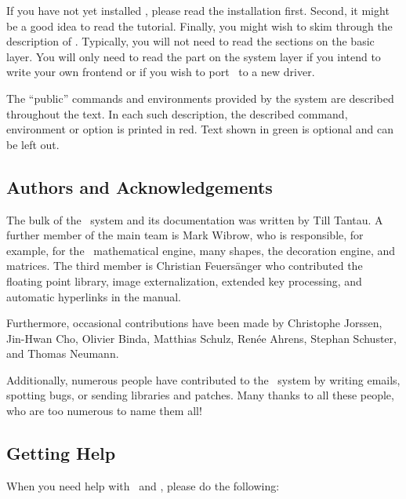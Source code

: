 If you have not yet installed \tikzname, please read the installation first.
Second, it might be a good idea to read the tutorial. Finally, you might wish
to skim through the description of \tikzname. Typically, you will not need to
read the sections on the basic layer. You will only need to read the part on
the system layer if you intend to write your own frontend or if you wish to
port \pgfname\ to a new driver.

The ``public'' commands and environments provided by the system are described
throughout the text. In each such description, the described command,
environment or option is printed in red. Text shown in green is optional and
can be left out.


\subsection{Authors and Acknowledgements}
\label{section-authors}

The bulk of the \pgfname\ system and its documentation was written by Till
Tantau. A further member of the main team is Mark Wibrow, who is responsible,
for example, for the \pgfname\ mathematical engine, many shapes, the decoration
engine, and matrices. The third member is Christian Feuers\"anger who
contributed the floating point library, image externalization, extended key
processing, and automatic hyperlinks in the manual.

Furthermore, occasional contributions have been made by Christophe Jorssen,
Jin-Hwan Cho, Olivier Binda, Matthias Schulz, Ren\'ee Ahrens, Stephan Schuster,
and Thomas Neumann.

Additionally, numerous people have contributed to the \pgfname\ system by
writing emails, spotting bugs, or sending libraries and patches. Many thanks to
all these people, who are too numerous to name them all!


\subsection{Getting Help}

When you need help with \pgfname\ and \tikzname, please do the following:

